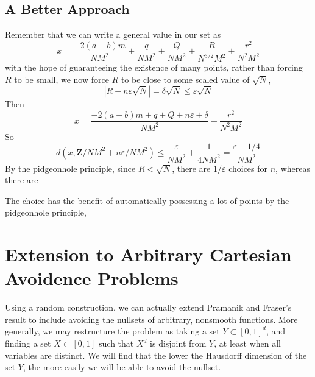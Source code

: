\documentclass{report}
\theoremstyle{plain}
\theoremstyle{plain}
\begin{document}
\section{A Better Approach}

Remember that we can write a general value in our set as
%
\[ x = \frac{-2(a-b)m}{NM^2} + \frac{q}{NM^2} + \frac{Q}{NM^2} + \frac{R}{N^{3/2} M^2} + \frac{r^2}{N^2M^2} \]
%
with the hope of guaranteeing the existence of many points, rather than forcing $R$ to be small, we now force $R$ to be close to some scaled value of $\sqrt{N}$, 
%
\[ |R - n \varepsilon \sqrt{N}| = \delta \sqrt{N} \leq \varepsilon \sqrt{N} \]
%
Then
%
\[ x = \frac{-2(a-b)m + q + Q + n\varepsilon + \delta}{NM^2} + \frac{r^2}{N^2M^2} \]
%
So
%
\[ d \left( x, \mathbf{Z}/NM^2 + n\varepsilon / NM^2 \right) \leq \frac{\varepsilon}{NM^2} + \frac{1}{4NM^2} = \frac{\varepsilon + 1/4}{NM^2} \]
%
By the pidgeonhole principle, since $R < \sqrt{N}$, there are $1/\varepsilon$ choices for $n$, whereas there are


The choice has the benefit of automatically possessing a lot of points by the pidgeonhole principle,

\chapter{Extension to Arbitrary Cartesian Avoidence Problems}

Using a random construction, we can actually extend Pramanik and Fraser's result to include avoiding the nullsets of arbitrary, nonsmooth functions. More generally, we may restructure the problem as taking a set $Y \subset [0,1]^d$, and finding a set $X \subset [0,1]$ such that $X^d$ is disjoint from $Y$, at least when all variables are distinct. We will find that the lower the Hausdorff dimension of the set $Y$, the more easily we will be able to avoid the nullset.
\end{document}
